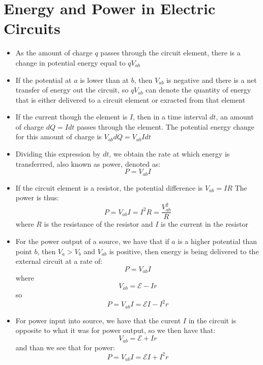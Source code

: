 \documentclass[11pt, a4paper]{article}
\begin{document}
\section[25.5, Energy and Power In Electric Circuits0]{Energy and Power in Electric Circuits}
\begin{itemize}
    \item As the amount of charge $q$ passes through the circuit element, there is a
        change in potential energy equal to $qV_{ab}$
    \item If the potential at $a$ is lower than at $b$, then $V_{ab}$ is negative and
        there is a net transfer of energy out the circuit, so $qV_{ab}$ can denote the
        quantity of energy that is either delivered to a circuit element or exracted from
        that element
    \item If the current though the element is $I$, then in a time interval $dt$, an
        amount of charge $dQ = Idt$ passes through the element. The potential energy
        change for this amount of charge is $V_{ab}dQ = V_{ab}Idt$
    \item Dividing this expression by $dt$, we obtain the rate at which energy is
        transferrred, also known as power, denoted as:
        \begin{equation}
            P = V_{ab}I
        \end{equation}
    \item If the circuit element is a resistor, the potential difference is $V_{ab} = IR$
        The power is thus:
        \begin{equation}
            P = V_{ab}I = I^2 R = \frac{V_{ab}^{2}}{R}
        \end{equation}
        where $R$ is the resistance of the resistor and $I$ is the current in the
        resistor
    \item For the power output of a source, we have that if $a$ is a higher potential
        than point $b$, then $V_{a} > V_{b}$ and $V_{ab}$ is positive, then energy is
        being delivered to the external circuit at a rate of:
        \begin{equation}
            P = V_{ab}I
        \end{equation}
        where
        \begin{equation}
            V_{ab} = \mathcal{E} - Ir
        \end{equation}
        so
        \begin{equation}
            P = V_{ab}I = \mathcal{E}I - I^2 r
        \end{equation}
    \item For power input into source, we have that the curent $I$ in the circuit is
        opposite to what it was for power output, so we then have that:
        \begin{equation}
            V_{ab} = \mathcal{E} + Ir
        \end{equation}
        and than we see that for power:
        \begin{equation}
            P = V_{ab}I = \mathcal{E}I + I^2 r
        \end{equation}
\end{itemize}
\end{document}
